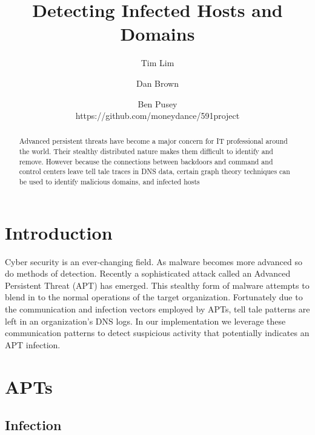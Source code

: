 \documentclass{article} %
\title{Detecting Infected Hosts and Domains}
\author{
Tim  Lim\\
\and
Dan Brown \\
\and
Ben Pusey \\
\AND
https://github.com/moneydance/591project
}
\begin{document}
\maketitle


\begin{abstract}
Advanced persistent threats have become a major concern for IT professional around the world. Their stealthy distributed nature makes them difficult 
to identify and remove. However because the connections between backdoors and command and control centers leave tell tale traces in DNS data, certain graph theory
techniques can be used to identify malicious domains, and infected hosts
\end{abstract}

\section{Introduction}
Cyber security is an ever-changing field. As malware becomes more advanced so do methods of detection. Recently a sophisticated attack called an Advanced Persistent Threat (APT) has emerged. This stealthy form of malware attempts to blend in to the normal operations of the target organization. Fortunately due to the communication and infection vectors employed by APTs,  tell tale patterns are left in an organization's DNS logs. In our implementation we leverage these communication patterns to detect suspicious activity that potentially indicates an APT infection.





\section{APTs}

\subsection{Infection}
\end{document}
